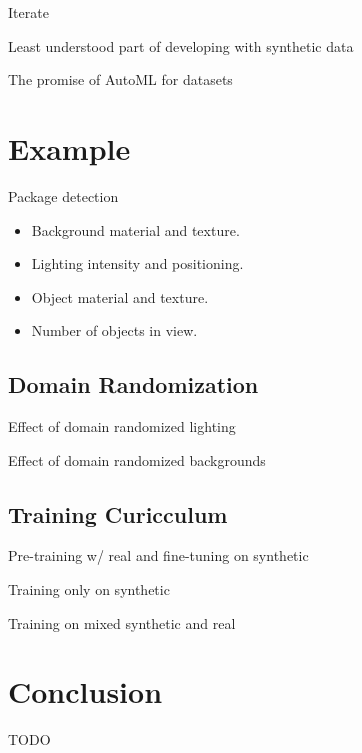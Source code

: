 \documentclass{article}
\begin{document}
Iterate

Least understood part of developing with synthetic data

The promise of AutoML for datasets


\section{Example}
\label{sec:example}

Package detection

\begin{itemize}
	\item Background material and texture.
	\item Lighting intensity and positioning.
	\item Object material and texture.
	\item Number of objects in view.
\end{itemize}

\subsection{Domain Randomization}
\label{sec:domainrandomization}

Effect of domain randomized lighting

Effect of domain randomized backgrounds

\subsection{Training Curicculum}
\label{sec:curicculum}

Pre-training w/ real and fine-tuning on synthetic

Training only on synthetic

Training on mixed synthetic and real

\section{Conclusion}
\label{sec:conclusion}

TODO



\end{document}
